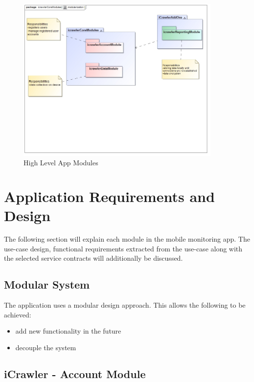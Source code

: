 \documentclass[hidelinks, 12pt, oneside]{article}
\begin{document}
			\begin{figure}[!htbp]
    			\centering
    			\includegraphics[width=0.9\textwidth]{img/highLevelSystem.jpg}
    			\caption{High Level App Modules}
    			\label{fig:highLevelSystem}
			\end{figure}

	\section{Application Requirements and Design}
	The following section will explain each module in the mobile monitoring app. The use-case design, functional requirements extracted from the use-case along with the selected service contracts will additionally be discussed.\newline
	
	\subsection{Modular System}
	 The application uses a modular design approach. This allows the following to be achieved:
	 \begin{itemize}
	\item add new functionality in the future
 	\item decouple the system
	\end{itemize}


	
	\subsection{iCrawler - Account Module}
\end{document}
